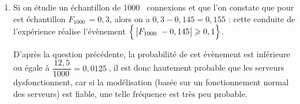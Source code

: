 \documentclass[10pt]{article}
\providecommand{\np}[2][]{{#2~#1}}
\begin{document}
\begin{enumerate}
\begin{enumerate}
On a donc bien l'inégalité annoncée.

		\item Si on étudie un échantillon de \np{1000} connexions et que l'on constate que pour cet échantillon $F_{\np{1000}}=0,3$, alors on a $0,3 - 0,145 = 0,155$ : cette conduite de l'expérience réalise l'évènement $\Big\{ \left|F_{\np{1000}} - 0,145\strut \right| \geqslant 0,1\Big\}$.

D'après la question précédente, la probabilité de cet évènement est inférieure ou égale à $\dfrac{12,5}{\np{1000}} = \np{0,0125}$, il est donc hautement probable que les serveurs dysfonctionnent, car si la modélisation (basée sur un fonctionnement normal des serveurs) est fiable, une telle fréquence est très peu probable.
	\end{enumerate}
\end{enumerate}

\bigskip
\end{document}
